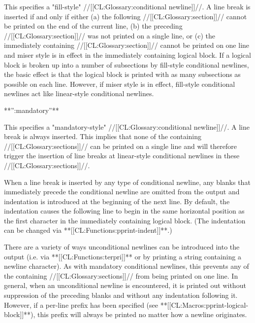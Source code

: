 This specifies a "fill-style" //[[CL:Glossary:conditional newline]]//. A line break is inserted if and only if either (a) the following //[[CL:Glossary:section]]// cannot be printed on the end of the current line, (b) the preceding //[[CL:Glossary:section]]// was not printed on a single line, or (c) the immediately containing //[[CL:Glossary:section]]// cannot be printed on one line and miser style is in effect in the immediately containing logical block. If a logical block is broken up into a number of subsections by fill-style conditional newlines, the basic effect is that the logical block is printed with as many subsections as possible on each line. However, if miser style is in effect, fill-style conditional newlines act like linear-style conditional newlines.

\item{**'':mandatory''**}

This specifies a "mandatory-style" //[[CL:Glossary:conditional newline]]//. A line break is always inserted. This implies that none of the containing //[[CL:Glossary:sections]]// can be printed on a single line and will therefore trigger the insertion of line breaks at linear-style conditional newlines in these //[[CL:Glossary:sections]]//.

\endlist

When a line break is inserted by any type of conditional newline, any blanks that immediately precede the conditional newline are omitted from the output and indentation is introduced at the beginning of the next line. By default, the indentation causes the following line to begin in the same horizontal position as the first character in the immediately containing logical block. (The indentation can be changed via **[[CL:Functions:pprint-indent]]**.)

There are a variety of ways unconditional newlines can be introduced into the output (i.e. via **[[CL:Functions:terpri]]** or by printing a string containing a newline character). As with mandatory conditional newlines, this prevents any of the containing //[[CL:Glossary:sections]]// from being printed on one line. In general, when an unconditional newline is encountered, it is printed out without suppression of the preceding blanks and without any indentation following it. However, if a per-line prefix has been specified (see **[[CL:Macros:pprint-logical-block]]**), this prefix will always be printed no matter how a newline originates.

